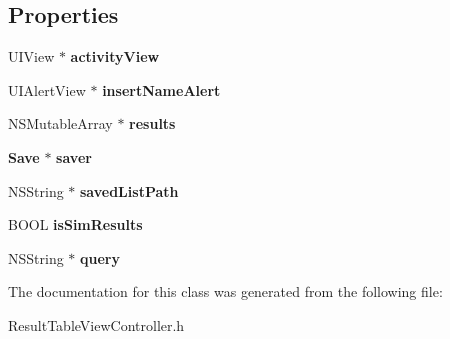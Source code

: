 \subsection*{Properties}
\begin{DoxyCompactItemize}
\item 
U\+I\+View $\ast$ {\bfseries activity\+View}\label{interface_result_table_view_controller_a12b9e07c3d6de0154e485752f1779f84}

\item 
U\+I\+Alert\+View $\ast$ {\bfseries insert\+Name\+Alert}\label{interface_result_table_view_controller_ab06cf17fb0348c3cc4d8e268a5667c01}

\item 
N\+S\+Mutable\+Array $\ast$ {\bfseries results}\label{interface_result_table_view_controller_aac9b268204aac1044dc8e7dbe2927409}

\item 
{\bf Save} $\ast$ {\bfseries saver}\label{interface_result_table_view_controller_af56b1c31e591ad111fa3558a48e3fe6e}

\item 
N\+S\+String $\ast$ {\bfseries saved\+List\+Path}\label{interface_result_table_view_controller_a3bc64243af0d4d0b1ac9e4b4ce219a97}

\item 
B\+O\+O\+L {\bfseries is\+Sim\+Results}\label{interface_result_table_view_controller_ab58149d144b5844f39ce667aa900268f}

\item 
N\+S\+String $\ast$ {\bfseries query}\label{interface_result_table_view_controller_a05210302a3f2f54ca86edab3bdfb8d36}

\end{DoxyCompactItemize}


The documentation for this class was generated from the following file\+:\begin{DoxyCompactItemize}
\item 
Result\+Table\+View\+Controller.\+h\end{DoxyCompactItemize}
